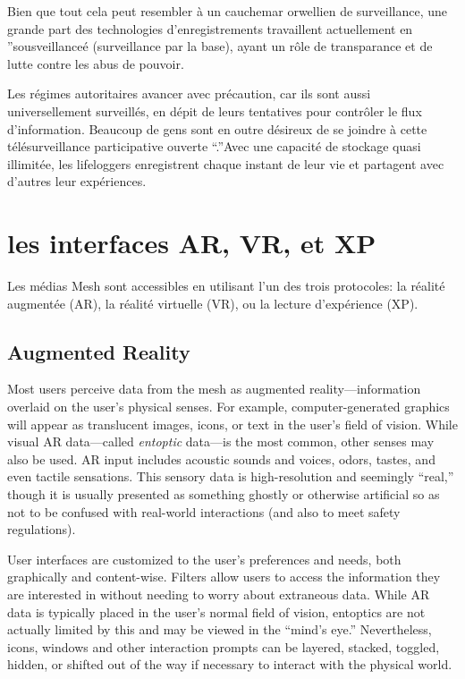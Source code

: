 Bien que tout cela peut resembler à un cauchemar orwellien de surveillance, une grande part des technologies d'enregistrements travaillent actuellement en ''sousveillanceé (surveillance par la base), ayant un rôle de transparance et de lutte contre les abus de pouvoir. 

Les régimes autoritaires avancer avec précaution, car ils sont aussi universellement surveillés, en dépit de leurs tentatives pour contrôler le flux d'information. Beaucoup de gens sont en outre désireux de se joindre à cette télésurveillance participative ouverte ``.''Avec une capacité de stockage quasi illimitée, les lifeloggers enregistrent chaque instant de leur vie et partagent avec d'autres leur expériences. 

\section{les interfaces AR, VR, et XP} 

Les médias Mesh sont accessibles en utilisant l'un des trois protocoles: la réalité augmentée (AR), la réalité virtuelle (VR), ou la lecture d'expérience (XP). 

\subsection{Augmented Reality} 

Most users perceive data from the mesh as augmented reality—information overlaid on the user's physical senses. For example, computer-generated graphics will appear as translucent images, icons, or text in the user's field of vision. While visual AR data—called \textit{entoptic} data—is the most common, other senses may also be used. AR input includes acoustic sounds and voices, odors, tastes, and even tactile sensations. This sensory data is high-resolution and seemingly ``real,'' though it is usually presented as something ghostly or otherwise artificial so as not to be confused with real-world interactions (and also to meet safety regulations). 

User interfaces are customized to the user's preferences and needs, both graphically and content-wise. Filters allow users to access the information they are interested in without needing to worry about extraneous data. While AR data is typically placed in the user's normal field of vision, entoptics are not actually limited by this and may be viewed in the ``mind's eye.'' Nevertheless, icons, windows and other interaction prompts can be layered, stacked, toggled, hidden, or shifted out of the way if necessary to interact with the physical world. 

